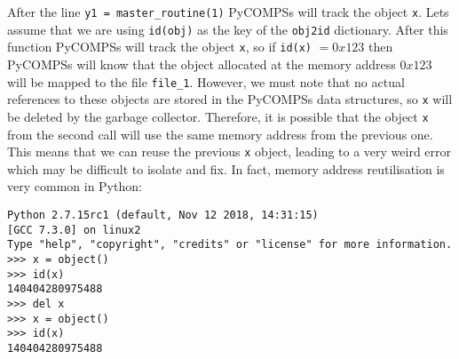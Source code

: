 \inputminted{python}{snippets/id_breaks.py}

After the line \verb|y1 = master_routine(1)| PyCOMPSs will track the object \verb|x|. Lets assume that we are using \verb|id(obj)| as the key of the \verb|obj2id| dictionary. After this function PyCOMPSs will track the object \verb|x|, so if \verb|id(x)| $ = 0x123$ then PyCOMPSs will know that the object allocated at the memory address $0x123$ will be mapped to the file \verb|file_1|. However, we must note that no actual references to these objects are stored in the PyCOMPSs data structures, so \verb|x| will be deleted by the garbage collector. Therefore, it is possible that the object \verb|x| from the second call will use the same memory address from the previous one. This means that we can reuse the previous \verb|x| object, leading to a very weird error which may be difficult to isolate and fix. In fact, memory address reutilisation is very common in Python:

\begin{verbatim}
Python 2.7.15rc1 (default, Nov 12 2018, 14:31:15) 
[GCC 7.3.0] on linux2
Type "help", "copyright", "credits" or "license" for more information.
>>> x = object()
>>> id(x)
140404280975488
>>> del x
>>> x = object()
>>> id(x)
140404280975488
\end{verbatim}

